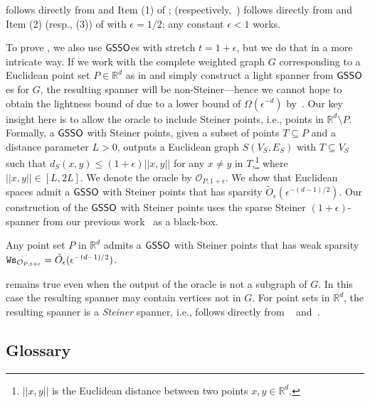  follows directly from  and Item (1) of ;  (respectively,~) follows directly from  and Item (2) (resp., (3)) of  with  $\epsilon = 1/2$; any constant $\epsilon < 1$ works.


To prove , we also use $\mathsf{GSSO}$es with stretch $t = 1+\epsilon$, but we do that in a more intricate way. If we work with the complete weighted graph $G$ corresponding to a Euclidean point set $P\in \mathbb{R}^d$ as in  and simply construct a light spanner from $\mathsf{GSSO}$es for $G$, the resulting spanner will be non-Steiner---hence we cannot hope to obtain the lightness bound of  due to a lower bound of $\Omega(\epsilon^{-d})$ by~\cite{LS19}. Our key insight here is to allow the oracle to include Steiner points, i.e., points in $\mathbb{R}^d\setminus P$. Formally, a $\mathsf{GSSO}$ with Steiner points, given a subset of points $T\subseteq P$ and a distance parameter $L > 0$,  outputs a Euclidean graph $S(V_S,E_S)$ with $T\subseteq V_S$ such that $d_S(x,y) \le (1+\epsilon) ||x,y||$ for any $x\not=y$ in $T$,\footnote{$||x,y||$ is the Euclidean distance between two points $x,y\in \mathbb{R}^d$.}  where $||x,y||\in [L,2L]$. We denote the oracle by $\mathcal{O}_{P,1+\epsilon}$. We show that  Euclidean spaces admit a $\mathsf{GSSO}$ with Steiner points that has sparsity $ \tilde{O}_{\epsilon}(\epsilon^{-(d-1)/2})$. Our construction of the $\mathsf{GSSO}$ with Steiner points uses the sparse Steiner $(1+\epsilon)$-spanner from our previous work~\cite{LS19} as a black-box.

\begin{theorem}\label{thm:Euclidean-oracle} Any point set $P$ in $\mathbb{R}^d$ admits a $\mathsf{GSSO}$ with Steiner points that has  weak sparsity $\mathtt{Ws}_{\mathcal{O}_{P,t+\epsilon}} = \tilde{O}_{\epsilon}(\epsilon^{-(d-1)/2})$.
\end{theorem}

 remains true even when the output of the oracle is not a subgraph of $G$. In this case the resulting spanner may contain vertices not in $G$. For point sets in $\mathbb{R}^d$, the resulting spanner is a \emph{Steiner} spanner, i.e.,  follows directly from ~ and~.




\subsection{Glossary}

